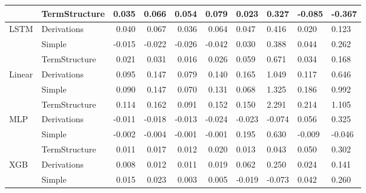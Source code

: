 \documentclass[10pt,letterpaper]{article}
\begin{document}
\begin{table}[!ht]
\begin{adjustwidth}{-2.25in}{0in}
\begin{tabular}{llrrrrp{1.5cm}p{1.5cm}p{1.5cm}p{1.5cm}}
    & TermStructure &  0.035 &  0.066 &    0.054 &      0.079 &                    0.023 &                    0.327 &                        -0.085 &                        -0.367 \\
\midrule
LSTM & Derivations &  0.040 &  0.067 &    0.036 &      0.064 &                    0.047 &                    0.416 &                         0.020 &                         0.123 \\
    & Simple & -0.015 & -0.022 &   -0.026 &     -0.042 &                    0.030 &                    0.388 &                         0.044 &                         0.262 \\
    & TermStructure &  0.021 &  0.031 &    0.016 &      0.026 &                    0.059 &                    0.671 &                         0.034 &                         0.168 \\
\midrule
Linear & Derivations &  0.095 &  0.147 &    0.079 &      0.140 &                    0.165 &                    1.049 &                         0.117 &                         0.646 \\
    & Simple &  0.090 &  0.147 &    0.070 &      0.131 &                    0.068 &                    1.325 &                         0.186 &                         0.992 \\
    & TermStructure &  0.114 &  0.162 &    0.091 &      0.152 &                    0.150 &                    2.291 &                         0.214 &                         1.105 \\
\midrule
MLP & Derivations & -0.011 & -0.018 &   -0.013 &     -0.024 &                   -0.023 &                   -0.074 &                         0.056 &                         0.325 \\
    & Simple & -0.002 & -0.004 &   -0.001 &     -0.001 &                    0.195 &                    0.630 &                        -0.009 &                        -0.046 \\
    & TermStructure &  0.011 &  0.017 &    0.012 &      0.020 &                    0.013 &                    0.043 &                         0.050 &                         0.302 \\
\midrule
XGB & Derivations &  0.008 &  0.012 &    0.011 &      0.019 &                    0.062 &                    0.250 &                         0.024 &                         0.141 \\
    & Simple &  0.015 &  0.023 &    0.003 &      0.005 &                   -0.019 &                   -0.073 &                         0.042 &                         0.260 \\

\end{tabular}
\end{adjustwidth}
\end{table}
\end{document}
